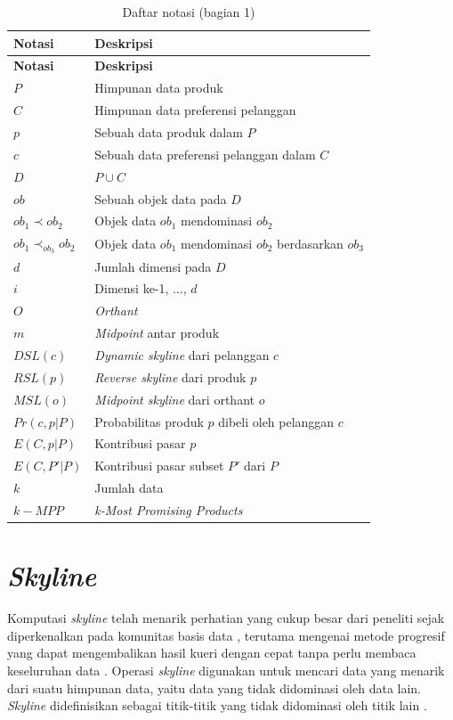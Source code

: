 \begin{longtable}{| p{3cm} | p{6cm} |} 
	\caption{Daftar notasi (bagian 1) \label{tab:daftar-notasi-1}}\\
	\hline
	\textbf{Notasi} & \textbf{Deskripsi}\\ \hline
	\endfirsthead
	\hline
	\textbf{Notasi} & \textbf{Deskripsi}\\ \hline
	\endhead
	$P$ & Himpunan data produk\\ \hline
	$C$ & Himpunan data preferensi pelanggan\\ \hline
	$p$ & Sebuah data produk dalam $P$\\ \hline
	$c$ & Sebuah data preferensi pelanggan dalam $C$\\ \hline
	$D$ & $P \cup C$ \\ \hline
	$ob$ & Sebuah objek data pada $D$\\ \hline
	$ob_1 \prec ob_2$ & Objek data $ob_1$ mendominasi $ob_2$\\ \hline
	$ob_1 \prec_{ob_3} ob_2$ & Objek data $ob_1$ mendominasi $ob_2$ berdasarkan $ob_3$\\ \hline
	$d$ & Jumlah dimensi pada $D$\\ \hline
	$i$ & Dimensi ke-1, ..., $d$\\ \hline
	$O$ & \textit{Orthant}\\ \hline
	$m$ & \textit{Midpoint} antar produk\\ \hline
	$DSL(c)$ & \textit{Dynamic skyline} dari pelanggan $c$\\ \hline
	$RSL(p)$ & \textit{Reverse skyline} dari produk $p$\\ \hline
	$MSL(o)$ & \textit{Midpoint skyline} dari orthant $o$\\ \hline
	$Pr(c, p|P)$ & Probabilitas produk $p$ dibeli oleh pelanggan $c$ \\ \hline
	$E(C, p|P)$ & Kontribusi pasar $p$\\ \hline
	$E(C, P'|P)$ & Kontribusi pasar subset $P'$ dari $P$ \\ \hline
	$k$ & Jumlah data \\ \hline
	$k-MPP$ & \textit{k-Most Promising Products} \\ \hline
\end{longtable}

\section{\textit{Skyline}}
\tab Komputasi \textit{skyline} telah menarik perhatian yang cukup besar dari peneliti sejak diperkenalkan pada komunitas basis data \cite{skyline}, terutama mengenai metode progresif yang dapat mengembalikan hasil kueri dengan cepat tanpa perlu membaca keseluruhan data \cite{dynamic-skyline}. Operasi \textit{skyline} digunakan untuk mencari data yang menarik dari suatu himpunan data, yaitu data yang tidak didominasi oleh data lain. \textit{Skyline} didefinisikan sebagai titik-titik yang tidak didominasi oleh titik lain \cite{skyline}.

